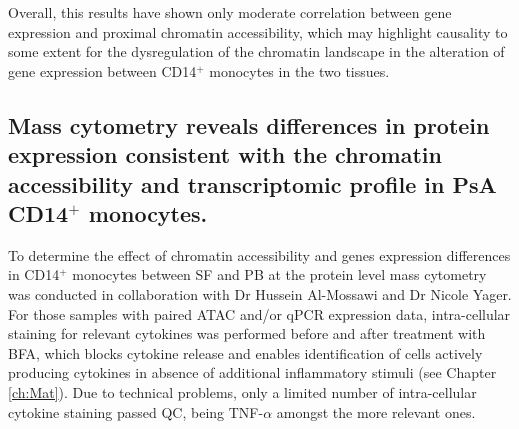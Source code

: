 Overall, this results have shown only moderate correlation between gene expression and proximal chromatin accessibility, which may highlight causality to some extent for the dysregulation of the chromatin landscape in the alteration of gene expression between CD14$^+$ monocytes in the two tissues.








\subsection{Mass cytometry reveals differences in protein expression consistent with the chromatin accessibility and transcriptomic profile in PsA CD14$^+$ monocytes.}

To determine the effect of chromatin accessibility and genes expression differences in CD14$^+$ monocytes between SF and PB at the protein level mass cytometry was conducted in collaboration with Dr Hussein Al-Mossawi and Dr Nicole Yager. For those samples with paired ATAC and/or qPCR expression data, intra-cellular staining for relevant cytokines was performed before and after treatment with BFA, which blocks cytokine release and enables identification of cells actively producing cytokines in absence of additional inflammatory stimuli (see Chapter \ref{ch:Mat}). Due to technical problems, only a limited number of intra-cellular cytokine staining passed QC, being TNF-$\alpha$ amongst the more relevant ones. 

